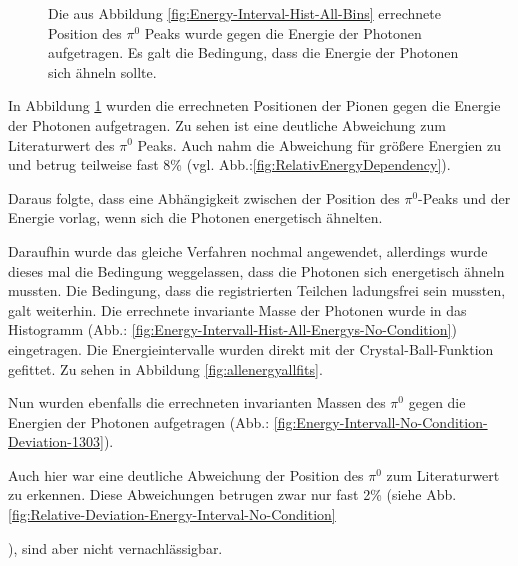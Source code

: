 \documentclass[a4paper,11pt,oneside,final,german,openbib,pdftex]{scrbook}
\begin{document}
{\begin{figure}[h!]
\begin{center}
 		\caption{Die aus Abbildung \ref{fig:Energy-Interval-Hist-All-Bins} errechnete Position des $\pi^0$ Peaks wurde gegen die Energie der Photonen aufgetragen.
 			Es galt die Bedingung, dass die Energie der Photonen sich \"ahneln sollte.
 		} 
 		\label{fig.Energydependency_pion}
 	\end{center}
 \end{figure}

In Abbildung \ref{fig.Energydependency_pion} wurden die errechneten Positionen der Pionen gegen die Energie der Photonen aufgetragen. Zu sehen ist eine deutliche Abweichung zum Literaturwert des $\pi^0$ Peaks. Auch nahm die Abweichung für größere Energien zu und betrug teilweise fast 8\% (vgl. Abb.:\ref{fig:RelativEnergyDependency}).
  
Daraus folgte, dass eine Abhängigkeit zwischen der Position des $\pi^0$-Peaks und der Energie vorlag, wenn sich die Photonen energetisch ähnelten.

Daraufhin wurde das gleiche Verfahren nochmal angewendet, allerdings wurde dieses mal die Bedingung weggelassen, dass die Photonen sich energetisch ähneln mussten. Die Bedingung, dass die registrierten Teilchen ladungsfrei sein mussten, galt weiterhin. Die errechnete invariante Masse der Photonen wurde in das Histogramm (Abb.: \ref{fig:Energy-Intervall-Hist-All-Energys-No-Condition}) eingetragen. Die Energieintervalle wurden direkt mit der Crystal-Ball-Funktion gefittet. Zu sehen in Abbildung \ref{fig:allenergyallfits}. 

Nun wurden ebenfalls die errechneten invarianten Massen des $\pi^0$ gegen die Energien der Photonen aufgetragen (Abb.: \ref{fig:Energy-Intervall-No-Condition-Deviation-1303}). 

Auch hier war eine deutliche Abweichung der Position des $\pi^0$ zum Literaturwert zu erkennen. Diese Abweichungen betrugen zwar nur fast 2\% (siehe Abb. \ref{fig:Relative-Deviation-Energy-Interval-No-Condition}}), sind aber nicht vernachl\"assigbar. 
\end{document}
